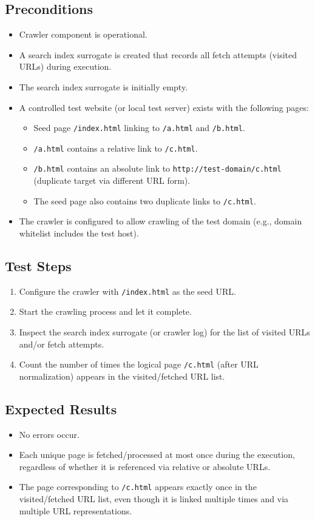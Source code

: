\documentclass{article}
\begin{document}
\subsection*{Preconditions}
\begin{itemize}
  \item Crawler component is operational.
  \item A search index surrogate is created that records all fetch attempts (visited URLs) during execution.
  \item The search index surrogate is initially empty.
  \item A controlled test website (or local test server) exists with the following pages:
    \begin{itemize}
      \item Seed page \texttt{/index.html} linking to \texttt{/a.html} and \texttt{/b.html}.
      \item \texttt{/a.html} contains a relative link to \texttt{/c.html}.
      \item \texttt{/b.html} contains an absolute link to \texttt{http://test-domain/c.html} (duplicate target via different URL form).
      \item The seed page also contains two duplicate links to \texttt{/c.html}.
    \end{itemize}
  \item The crawler is configured to allow crawling of the test domain (e.g., domain whitelist includes the test host).
\end{itemize}

\subsection*{Test Steps}
\begin{enumerate}
  \item Configure the crawler with \texttt{/index.html} as the seed URL.
  \item Start the crawling process and let it complete.
  \item Inspect the search index surrogate (or crawler log) for the list of visited URLs and/or fetch attempts.
  \item Count the number of times the logical page \texttt{/c.html} (after URL normalization) appears in the visited/fetched URL list.
\end{enumerate}

\subsection*{Expected Results}
\begin{itemize}
  \item No errors occur.
  \item Each unique page is fetched/processed at most once during the execution, regardless of whether it is referenced via relative or absolute URLs.
  \item The page corresponding to \texttt{/c.html} appears exactly once in the visited/fetched URL list, even though it is linked multiple times and via multiple URL representations.
\end{itemize}
\end{document}
